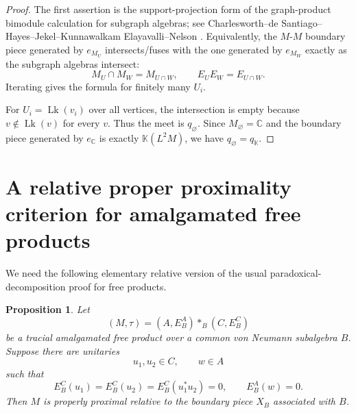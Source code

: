 \documentclass[11pt]{amsart}
\newtheorem{proposition}[theorem]{Proposition}
\theoremstyle{definition}
\newcommand{\Lk}{\operatorname{Lk}}
\newcommand{\K}{\mathbb K}
\newcommand{\C}{\mathbb C}
\newcommand{\freeprod}{\mathop{*}}
\begin{document}
\begin{proof}
The first assertion is the support-projection form of the graph-product bimodule calculation for subgraph algebras; see Charlesworth--de Santiago--Hayes--Jekel--Kunnawalkam Elayavalli--Nelson \cite[Theorem 0.4, Theorem 5.4, and Proposition 5.5]{CDHJKEN}.  Equivalently, the $M$-$M$ boundary piece generated by $e_{M_U}$ intersects/fuses with the one generated by $e_{M_W}$ exactly as the subgraph algebras intersect:
\[
M_U\cap M_W=M_{U\cap W},
\qquad
E_U E_W=E_{U\cap W}.
\]
Iterating gives the formula for finitely many $U_i$.

For $U_i=\Lk(v_i)$ over all vertices, the intersection is empty because $v\notin \Lk(v)$ for every $v$.  Thus the meet is $q_\varnothing$.  Since $M_\varnothing=\C$ and the boundary piece generated by $e_{\C}$ is exactly $\K(L^2M)$, we have $q_\varnothing=q_{\K}$.
\end{proof}

\section{A relative proper proximality criterion for amalgamated free products}

We need the following elementary relative version of the usual paradoxical-decomposition proof for free products.

\begin{proposition}\label{prop:AFP}
Let
\[
(M,\tau)=(A,E_B^A)\freeprod_B(C,E_B^C)
\]
be a tracial amalgamated free product over a common von Neumann subalgebra $B$.  Suppose there are unitaries
\[
u_1,u_2\in C,\qquad w\in A
\]
such that
\[
E_B^C(u_1)=E_B^C(u_2)=E_B^C(u_1^*u_2)=0,
\qquad
E_B^A(w)=0.
\]
Then $M$ is properly proximal relative to the boundary piece $X_B$ associated with $B$.
\end{proposition}
\end{document}
